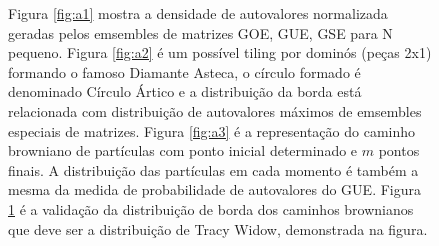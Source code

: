 \documentclass[12pt]{report}
\begin{document}
\begin{figure}
\begin{subfigure}{.5\textwidth}
		\label{fig:a4}
	\end{subfigure}
	\caption{Figura \ref{fig:a1} mostra a densidade de autovalores normalizada geradas pelos emsembles de matrizes GOE, GUE, GSE para N pequeno. Figura \ref{fig:a2} é um possível tiling por dominós (peças 2x1) formando o famoso Diamante Asteca, o círculo formado é denominado Círculo Ártico e a distribuição da borda está relacionada com distribuição de autovalores máximos de emsembles especiais de matrizes. Figura \ref{fig:a3} é a representação do caminho browniano de partículas com ponto inicial determinado e $m$ pontos finais. A distribuição das partículas em cada momento é também a mesma da medida de probabilidade de autovalores do GUE. Figura \ref{fig:a4} é a validação da distribuição de borda dos caminhos brownianos que deve ser a distribuição de Tracy Widow, demonstrada na figura. }
	\label{fig:atividades}
\end{figure}
\end{document}
